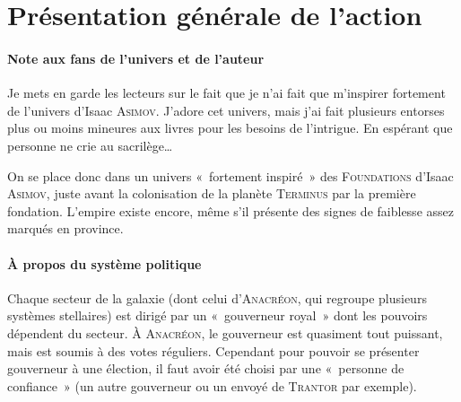 \section{Présentation générale de l’action}

\paragraph{Note aux fans de l’univers et de l’auteur}{
	Je mets en garde les lecteurs sur le fait que je n’ai fait que m’inspirer fortement de l’univers d’Isaac \textsc{Asimov}.
	J’adore cet univers, mais j’ai fait plusieurs entorses plus ou moins mineures aux livres pour les besoins de l’intrigue.
	En espérant que personne ne crie au sacrilège…

	On se place donc dans un univers «~fortement inspiré~» des \textsc{Foundations} d’Isaac \textsc{Asimov}, juste avant la colonisation de la planète \textsc{Terminus} par la première fondation. L’empire existe encore, même s’il présente des signes de faiblesse assez marqués en province.
}

\paragraph{À propos du système politique}
{
Chaque secteur de la galaxie (dont celui d’\textsc{Anacréon}, qui regroupe plusieurs systèmes stellaires) est dirigé par un «~gouverneur royal~» dont les pouvoirs dépendent du secteur.
À \textsc{Anacréon}, le gouverneur est quasiment tout puissant, mais est soumis à des votes réguliers.
Cependant pour pouvoir se présenter gouverneur à une élection, il faut avoir été choisi par une «~personne de confiance~» (un autre gouverneur ou un envoyé de \textsc{Trantor} par exemple).
}

